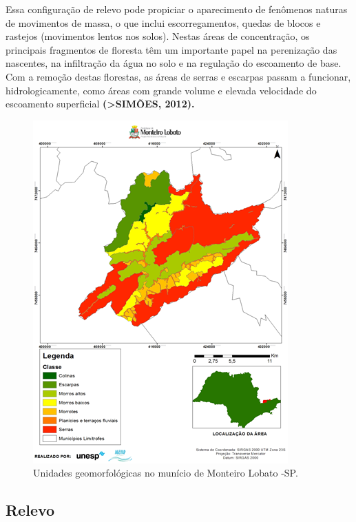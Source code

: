 Essa configuração de relevo pode propiciar o aparecimento de fenômenos naturas de movimentos de massa, o que inclui escorregamentos, quedas de blocos e rastejos (movimentos lentos nos solos). Nestas áreas de concentração, os principais fragmentos de floresta têm um importante papel na perenização das nascentes, na infiltração da água no solo e na regulação do escoamento de base. Com a remoção destas florestas, as áreas de serras e escarpas passam a funcionar, hidrologicamente, como áreas com grande volume e elevada velocidade do escoamento superficial \textbf{(>SIMÕES, 2012).}
\clearpage
 \begin{figure}[h!]
 	\centering
 	\includegraphics[width=1\linewidth]{produtos/proddois/image28}
 	\caption{Unidades geomorfológicas no munício de Monteiro Lobato -SP.}
 	\label{fig:image28}
 \end{figure}

\subsection{Relevo}

